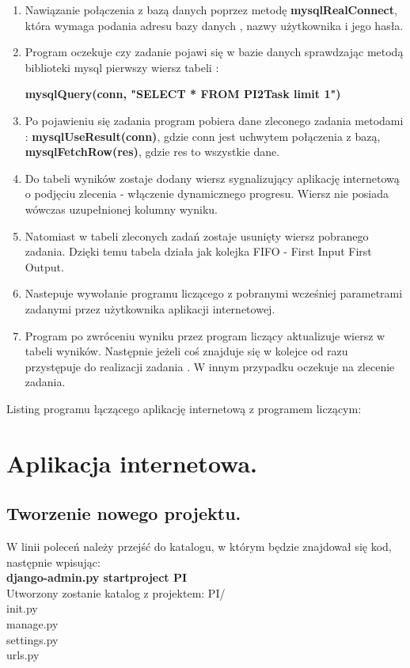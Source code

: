 \documentclass[a4paper,12pt]{article}		%
\begin{document}
\begin{enumerate}
\item Nawiązanie połączenia z bazą danych poprzez metodę \textbf{mysqlRealConnect}, która wymaga podania adresu bazy danych , nazwy użytkownika i jego hasła.

\item Program oczekuje czy zadanie pojawi się w bazie danych sprawdzając metodą biblioteki mysql pierwszy wiersz tabeli :

\begin{center}
\textbf{mysqlQuery(conn, "SELECT * FROM PI2Task limit 1")}
\end{center}

\item Po pojawieniu się zadania program pobiera dane zleconego zadania metodami : \textbf{mysqlUseResult(conn)}, gdzie conn jest uchwytem połączenia z bazą, \textbf{mysqlFetchRow(res)}, gdzie res to wszystkie dane.

\item Do tabeli wyników zostaje dodany wiersz sygnalizujący aplikację internetową o podjęciu zlecenia - włączenie dynamicznego progresu. Wiersz nie posiada wówczas uzupełnionej kolumny wyniku.

\item Natomiast  w tabeli zleconych zadań zostaje usunięty wiersz pobranego zadania. Dzięki temu tabela działa jak kolejka FIFO - First Input First Output. 

\item Nastepuje wywołanie programu liczącego z pobranymi wcześniej parametrami zadanymi przez użytkownika aplikacji internetowej. 

\item Program po zwróceniu wyniku przez program liczący aktualizuje wiersz w tabeli wyników. Następnie jeżeli coś znajduje się w kolejce od razu przystępuje do realizacji zadania . W innym przypadku oczekuje na zlecenie zadania. 
\end{enumerate}

Listing programu łączącego aplikację internetową z programem liczącym:



\section{Aplikacja internetowa.}

\subsection{Tworzenie nowego projektu.}
W linii poleceń należy przejść do katalogu, w którym będzie znajdował się kod, następnie wpisując:\\
\textbf{django-admin.py startproject PI}\\
Utworzony zostanie katalog z projektem:
PI/\\
init.py\\
manage.py\\
settings.py\\
urls.py
\end{document}
